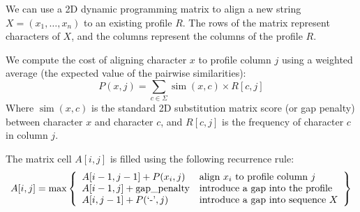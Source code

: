 We can use a 2D dynamic programming matrix to align a new string $X = (x_1, \dots, x_n)$ to an existing profile $R$. The rows of the matrix represent characters of $X$, and the columns represent the columns of the profile $R$.

We compute the cost of aligning character $x$ to profile column $j$ using a weighted average (the expected value of the pairwise similarities):
\begin{equation}
P(x, j) = \sum_{c \in \Sigma} \operatorname{sim}(x, c) \times R[c, j]
\end{equation}
Where $\operatorname{sim}(x, c)$ is the standard 2D substitution matrix score (or gap penalty) between character $x$ and character $c$, and $R[c,j]$ is the frequency of character $c$ in column $j$.

The matrix cell $A[i,j]$ is filled using the following recurrence rule:
\begin{equation}
A[i,j] = \max \left\{ \begin{array}{ll}
A[i-1, j-1] + P(x_i, j) & \text{align } x_i \text{ to profile column } j \\
A[i-1, j] + \text{gap\_penalty} & \text{introduce a gap into the profile} \\
A[i, j-1] + P(\text{`\text{-}'}, j) & \text{introduce a gap into sequence } X
\end{array} \right\}
\end{equation}


